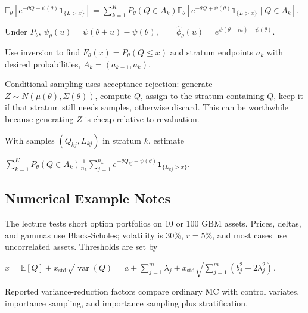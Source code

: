$\mathbb{E}_\theta[e^{-\theta Q+\psi(\theta)}\mathbf{1}_{\{L>x\}}]=\sum_{k=1}^KP_\theta(Q\in A_k)\mathbb{E}_\theta[e^{-\theta Q+\psi(\theta)}\mathbf{1}_{\{L>x\}}\mid Q\in A_k]$.

Under $P_\theta$,
$\psi_\theta(u)=\psi(\theta+u)-\psi(\theta),\qquad \hat\phi_\theta(u)=e^{\psi(\theta+iu)-\psi(\theta)}$.

Use inversion to find $F_\theta(x)=P_\theta(Q\le x)$ and stratum endpoints $a_k$ with desired probabilities, $A_k=(a_{k-1},a_k)$.

Conditional sampling uses acceptance-rejection: generate $Z\sim N(\mu(\theta),\Sigma(\theta))$, compute $Q$, assign to the stratum containing $Q$, keep it if that stratum still needs samples, otherwise discard. This can be worthwhile because generating $Z$ is cheap relative to revaluation.

With samples $(Q_{kj},L_{kj})$ in stratum $k$, estimate

$\sum_{k=1}^KP_\theta(Q\in A_k)\frac1{n_k}\sum_{j=1}^{n_k}e^{-\theta Q_{kj}+\psi(\theta)}\mathbf{1}_{\{L_{kj}>x\}}$.

\subsection{Numerical Example Notes}

The lecture tests short option portfolios on 10 or 100 GBM assets. Prices, deltas, and gammas use Black-Scholes; volatility is 30\%, $r=5\%$, and most cases use uncorrelated assets. Thresholds are set by

$x=\mathbb{E}[Q]+x_{\mathrm{std}}\sqrt{\operatorname{var}(Q)}=a+\sum_{j=1}^m\lambda_j+x_{\mathrm{std}}\sqrt{\sum_{j=1}^m(b_j^2+2\lambda_j^2)}$.

Reported variance-reduction factors compare ordinary MC with control variates, importance sampling, and importance sampling plus stratification.
